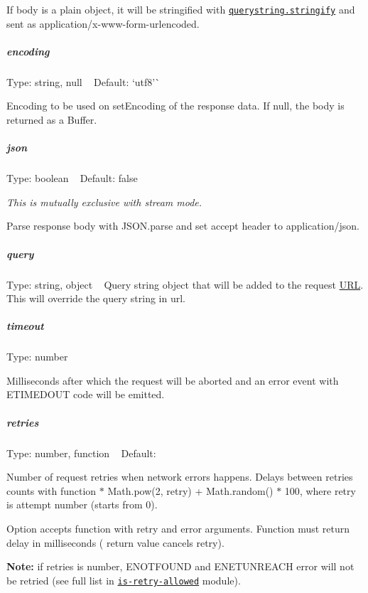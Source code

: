 If {\ttfamily body} is a plain object, it will be stringified with \href{https://nodejs.org/api/querystring.html#querystring_querystring_stringify_obj_sep_eq_options}{\tt {\ttfamily querystring.\+stringify}} and sent as {\ttfamily application/x-\/www-\/form-\/urlencoded}.

\subparagraph*{encoding}

Type\+: {\ttfamily string}, {\ttfamily null} ~\newline
Default\+: `\textquotesingle{}utf8'\`{}

Encoding to be used on {\ttfamily set\+Encoding} of the response data. If {\ttfamily null}, the body is returned as a Buffer.

\subparagraph*{json}

Type\+: {\ttfamily boolean} ~\newline
Default\+: {\ttfamily false}

{\itshape This is mutually exclusive with stream mode.}

Parse response body with {\ttfamily J\+S\+O\+N.\+parse} and set {\ttfamily accept} header to {\ttfamily application/json}.

\subparagraph*{query}

Type\+: {\ttfamily string}, {\ttfamily object} ~\newline
 Query string object that will be added to the request \mbox{\hyperlink{namespace_u_r_l}{U\+RL}}. This will override the query string in {\ttfamily url}.

\subparagraph*{timeout}

Type\+: {\ttfamily number}

Milliseconds after which the request will be aborted and an error event with {\ttfamily E\+T\+I\+M\+E\+D\+O\+UT} code will be emitted.

\subparagraph*{retries}

Type\+: {\ttfamily number}, {\ttfamily function} ~\newline
Default\+: {}

Number of request retries when network errors happens. Delays between retries counts with function { $\ast$ Math.\+pow(2, retry) + Math.\+random() $\ast$ 100}, where {\ttfamily retry} is attempt number (starts from 0).

Option accepts {\ttfamily function} with {\ttfamily retry} and {\ttfamily error} arguments. Function must return delay in milliseconds ({} return value cancels retry).

{\bfseries Note\+:} if {\ttfamily retries} is {\ttfamily number}, {\ttfamily E\+N\+O\+T\+F\+O\+U\+ND} and {\ttfamily E\+N\+E\+T\+U\+N\+R\+E\+A\+CH} error will not be retried (see full list in \href{https://github.com/floatdrop/is-retry-allowed/blob/master/index.js#L12}{\tt {\ttfamily is-\/retry-\/allowed}} module).

